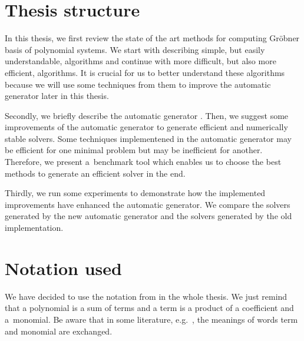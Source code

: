 \section{Thesis structure}
In this thesis, we first review the state of the art methods for computing Gr\"obner basis of polynomial systems. We start with describing simple, but easily understandable, algorithms and continue with more difficult, but also more efficient, algorithms. It is crucial for us to better understand these algorithms because we will use some techniques from them to improve the automatic generator later in this thesis.

Secondly, we briefly describe the automatic generator \cite{AutoGen}. Then, we suggest some improvements of the automatic generator to generate efficient and numerically stable solvers. Some techniques implementened in the automatic generator may be efficient for one minimal problem but may be inefficient for another. Therefore, we present a~benchmark tool which enables us to choose the best methods to generate an efficient solver in the end.

Thirdly, we run some experiments to demonstrate how the implemented improvements have enhanced the automatic generator. We compare the solvers generated by the new automatic generator and the solvers generated by the old implementation.

\section{Notation used}
We have decided to use the notation from \cite{Cox-Little-Shea97} in the whole thesis. We just remind that a polynomial is a sum of terms and a term is a product of a coefficient and a~monomial. Be aware that in some literature, e.g.\ \cite{Becker93, F4, F5}, the meanings of words term and monomial are exchanged.
